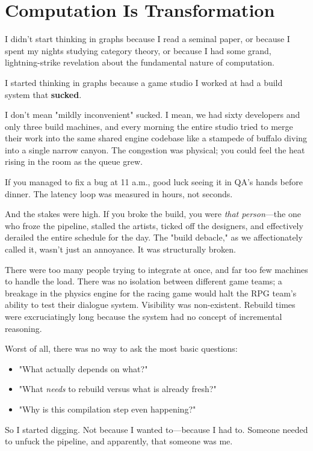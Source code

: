\chapter{Computation Is Transformation}
\label{chap:computation-is-transformation}

I didn't start thinking in graphs because I read a seminal paper, or because I spent my nights studying category theory, or because I had some grand, lightning-strike revelation about the fundamental nature of computation.

I started thinking in graphs because a game studio I worked at had a build system that \textbf{sucked}.

I don't mean "mildly inconvenient" sucked. I mean, we had sixty developers and only three build machines, and every morning the entire studio tried to merge their work into the same shared engine codebase like a stampede of buffalo diving into a single narrow canyon. The congestion was physical; you could feel the heat rising in the room as the queue grew.

If you managed to fix a bug at 11 a.m., good luck seeing it in QA's hands before dinner. The latency loop was measured in hours, not seconds.

And the stakes were high. If you broke the build, you were \textit{that person}—the one who froze the pipeline, stalled the artists, ticked off the designers, and effectively derailed the entire schedule for the day. The "build debacle," as we affectionately called it, wasn't just an annoyance. It was structurally broken.

There were too many people trying to integrate at once, and far too few machines to handle the load. There was no isolation between different game teams; a breakage in the physics engine for the racing game would halt the RPG team's ability to test their dialogue system. Visibility was non-existent. Rebuild times were excruciatingly long because the system had no concept of incremental reasoning.

Worst of all, there was no way to ask the most basic questions:
\begin{itemize}
    \item "What actually depends on what?"
    \item "What \textit{needs} to rebuild versus what is already fresh?"
    \item "Why is this compilation step even happening?"
\end{itemize}

So I started digging. Not because I wanted to—because I had to. Someone needed to unfuck the pipeline, and apparently, that someone was me.

